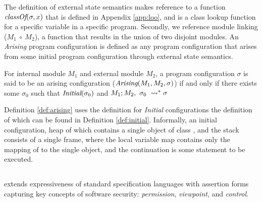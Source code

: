 The definition of external state semantics makes reference to a function
$\textit{classOf}(\sigma, x)$ that is defined in Appendix \ref{app:loo}, and
is a class lookup function for a specific variable in a specific program.
Secondly, we reference module linking ($M_1\ \circ\ M_2$), a function
that results in the union of two disjoint modules.
An \emph{Arising} program configuration is defined as any program configuration
that arises from some initial program configuration through external state semantics.
\begin{definition}
\label{def:arising}
For internal module $M_1$ and external module $M_2$, a program configuration $\sigma$ is 
said to be an arising configuration ($\textit{Arising}(M_1, M_2, \sigma)$)
if and only if there exists some $\sigma_0$ such that $\textit{Initial}(\sigma_0)$ and
$M_1 ; M_2,\ \sigma_0\ \leadsto^* \sigma$
\end{definition}
Definition \ref{def:arising} uses the definition for \emph{Initial} configurations 
the definition of which can be found in Definition \ref{def:initial}. Informally, 
an initial configuration, heap of which contains a single object of class , and
the stack consists of a single frame, where the local variable map contains only the 
mapping of  to the single object, and the continuation is some statement
to be executed.



\subsection{\Chainmail}
\Chainmail extends expressiveness of standard specification languages
with assertion forms capturing key concepts of software security:
 \emph{permission}, \emph{viewpoint}, and \emph{control}.

